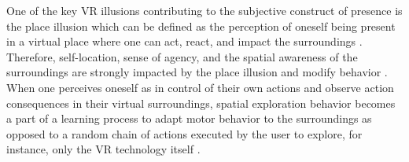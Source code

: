 One of the key VR illusions contributing to the subjective construct of presence is the place illusion which can be defined as the perception of oneself being present in a virtual place where one can act, react, and impact the surroundings \cite{Slater2009}. Therefore, self-location, sense of agency, and the spatial awareness of the surroundings are strongly impacted by the place illusion and modify behavior \cite{Kilteni2012}. When one perceives oneself as in control of their own actions and observe action consequences in their virtual surroundings, spatial exploration behavior becomes a part of a learning process to adapt motor behavior to the surroundings as opposed to a random chain of actions executed by the user to explore, for instance, only the VR technology itself \cite{Tan2011}.


